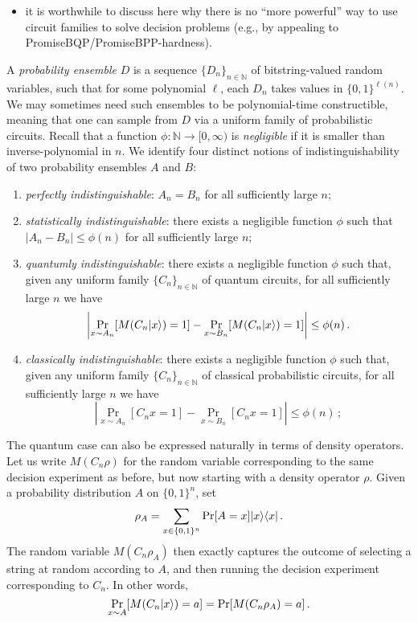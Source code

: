 \documentclass[11pt]{article}
\numberwithin{equation}{section}
\newcommand{\N}{\mathbb{N}}
\begin{document}
{\begin{itemize}
\item it is worthwhile to discuss here why there is no ``more powerful'' way to use circuit families to solve decision problems (e.g., by appealing to PromiseBQP/PromiseBPP-hardness).
\end{itemize}

A \emph{probability ensemble} $D$ is a sequence $\{D_n\}_{n \in \N}$ of bitstring-valued random variables, such that for some polynomial $\ell$, each $D_n$ takes values in $\{0,1\}^{\ell(n)}$. We may sometimes need such ensembles to be polynomial-time constructible, meaning that one can sample from $D$ via a uniform family of probabilistic circuits. Recall that a function $\phi: \N \rightarrow [0, \infty)$ is \emph{negligible} if it is smaller than inverse-polynomial in $n$.  We identify four distinct notions of indistinguishability of two probability ensembles $A$ and $B$:
\begin{enumerate}
\item \emph{perfectly indistinguishable}: $A_n = B_n$ for all sufficiently large $n$;
\item \emph{statistically indistinguishable}: there exists a negligible function $\phi$ such that $|A_n - B_n| \leq \phi(n)$ for all sufficiently large $n$;
\item \emph{quantumly indistinguishable}: there exists a negligible function $\phi$ such that, given any uniform family $\{C_n\}_{n \in \N}$ of quantum circuits, for all sufficiently large $n$ we have
$$
\left| \Pr_{x \sim A_n} [M(C_n {\left\vert{x}\right\rangle}) = 1] - \Pr_{x \sim B_n} [M(C_n {\left\vert{x}\right\rangle}) = 1] \right| \leq \phi(n)\,.
$$
\item \emph{classically indistinguishable}: there exists a negligible function $\phi$ such that, given any uniform family $\{C_n\}_{n \in \N}$ of classical probabilistic circuits, for all sufficiently large $n$ we have
$$
\left| \Pr_{x \sim A_n} [C_n x = 1] - \Pr_{x \sim B_n}[C_n x = 1] \right| \leq \phi(n)\,;
$$
\end{enumerate}

The quantum case can also be expressed naturally in terms of density operators. Let us write $M(C_n \rho)$ for the random variable corresponding to the same decision experiment as before, but now starting with a density operator $\rho$. Given a probability distribution $A$ on $\{0,1\}^n$, set
$$
\rho_A = \sum_{x \in \{0,1\}^n} \Pr[A = x] {\left\vert{x}\right\rangle} {\left\langle{x}\right\vert}\,.
$$
The random variable $M(C_n \rho_A)$ then exactly captures the outcome of selecting a string at random according to $A$, and then running the decision experiment corresponding to $C_n$. In other words,
$$
\Pr_{x \sim A} [M(C_n {\left\vert{x}\right\rangle}) = a] = \Pr[M(C_n \rho_A) = a]\,.
$$

}
\end{document}

